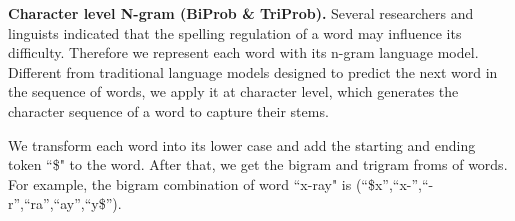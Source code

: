 \textbf{Character level N-gram (BiProb \& TriProb).} 
Several researchers and linguists indicated that the spelling regulation of a word may influence its difficulty.
Therefore we represent each word with its n-gram language model.
Different from traditional language models designed to predict the next word in the sequence of words,  we apply it at character level, which generates the character sequence of a word to capture their stems.

We transform each word into its lower case and add the starting and ending token ``\$" to the word. After that, we get the bigram and trigram froms of words. For example, the bigram combination of word ``x-ray" is (``\$x'',``x-'',``-r'',``ra'',``ay'',``y\$'').

